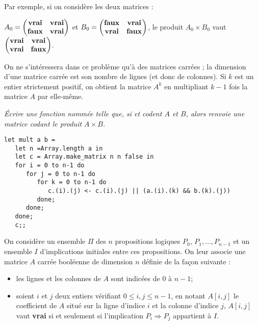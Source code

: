 \medskip

Par exemple, si on considère les deux matrices :

$A_{0} = \begin{pmatrix} {\bf vrai} & {\bf vrai} \\ {\bf faux} & {\bf vrai} \end{pmatrix}$
et $B_{0} = \begin{pmatrix}  {\bf faux} & {\bf vrai} \\  {\bf vrai} & {\bf faux} \end{pmatrix}$, 
le produit $A_{0} \times B_{0}$ vaut 
$\begin{pmatrix} {\bf vrai} & {\bf vrai} \\ {\bf vrai} & {\bf faux}\end{pmatrix}$.

On ne s'intéressera dans ce problème qu'à des matrices carrées ; la dimension d'une matrice carrée est son nombre de lignes (et donc de colonnes). Si $k$ est un entier strictement positif, on obtient la matrice $A^{k}$ en multipliant $k - 1$ fois la matrice $A$ par elle-même.

\begin{Exercise}\it
Écrire une fonction nommée  telle que, si  et  codent $A$ et $B$, alors  renvoie une matrice codant le produit $A \times B$.
\end{Exercise}
\begin{Answer}
\begin{lstlisting}
let mult a b =
   let n =Array.length a in
   let c = Array.make_matrix n n false in
   for i = 0 to n-1 do
      for j = 0 to n-1 do
         for k = 0 to n-1 do
            c.(i).(j) <- c.(i).(j) || (a.(i).(k) && b.(k).(j)) 
         done;
      done;
   done;
   c;;  
\end{lstlisting}
\end{Answer}

\newpage

 On considère un ensemble $\Pi$ des $n$ propositions logiques $P_{0}$, $P_{1}, \ldots, P_{n-1}$ et un ensemble $I$ d'implications initiales entre ces propositions. On leur associe une matrice $A$ carrée booléenne de dimension $n$ définie de la façon suivante :
    \begin{itemize}
        \item les lignes et les colonnes de $A$ sont indicées de 0 à $n-1$;
	\item soient $i$ et $j$ deux entiers vérifiant $0\le i, j\le n-1$, en notant $A[i,j]$ le coefficient de $A$ situé sur la ligne d'indice $i$ et la colonne d'indice $j$, $A[i, j]$ vaut {\bf vrai} si et seulement si l'implication $P_{i} \Rightarrow P_{j}$ appartient à $I$.
\end{itemize}

